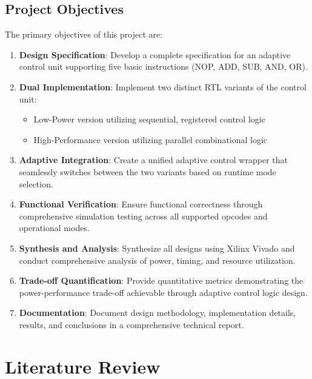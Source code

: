 \documentclass[15pt,a4paper]{report}
\begin{document}
\section{Project Objectives}

The primary objectives of this project are:

\begin{enumerate}
    \item \textbf{Design Specification}: Develop a complete specification for an adaptive control unit supporting five basic instructions (NOP, ADD, SUB, AND, OR).
    
    \item \textbf{Dual Implementation}: Implement two distinct RTL variants of the control unit:
    \begin{itemize}
        \item Low-Power version utilizing sequential, registered control logic
        \item High-Performance version utilizing parallel combinational logic
    \end{itemize}
    
    \item \textbf{Adaptive Integration}: Create a unified adaptive control wrapper that seamlessly switches between the two variants based on runtime mode selection.
    
    \item \textbf{Functional Verification}: Ensure functional correctness through comprehensive simulation testing across all supported opcodes and operational modes.
    
    \item \textbf{Synthesis and Analysis}: Synthesize all designs using Xilinx Vivado and conduct comprehensive analysis of power, timing, and resource utilization.
    
    \item \textbf{Trade-off Quantification}: Provide quantitative metrics demonstrating the power-performance trade-off achievable through adaptive control logic design.
    
    \item \textbf{Documentation}: Document design methodology, implementation details, results, and conclusions in a comprehensive technical report.
\end{enumerate}

\newpage

\chapter{Literature Review}
\end{document}
